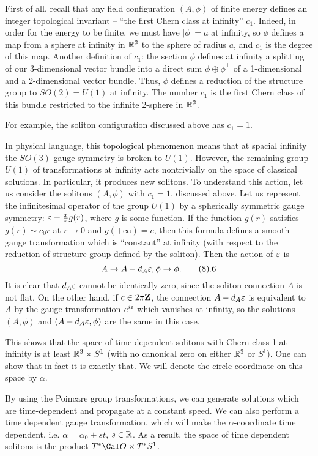 First of all, recall that
any field configuration $(A,\phi)$ of finite energy 
defines an integer 
topological invariant -- ``the first Chern class at infinity''
$c_1$. Indeed, in order for the energy to be finite, we must have 
$|\phi|=a$ at infinity, so $\phi$ defines a map from a
sphere at infinity in $\Bbb R^3$ to the sphere of radius $a$, and $c_1$ is
the degree of this map. Another definition of $c_1$:  
the section $\phi$ defines 
at infinity a splitting of our 3-dimensional vector bundle into a direct sum 
$\phi\oplus\phi^\perp$ of a 1-dimensional and a 2-dimensional vector bundle. 
Thus, $\phi$ defines a reduction of the structure group to $SO(2)=U(1)$ at 
infinity. The number $c_1$ is the first Chern class of this bundle restricted
to the infinite 2-sphere in $\Bbb R^3$. 

For example, the soliton configuration discussed above has $c_1=1$. 

In physical language, this topological phenomenon means that
at spacial infinity the $SO(3)$ gauge symmetry is broken to $U(1)$.  
However, the remaining group $U(1)$ of transformations at infinity acts
nontrivially on the space of classical solutions.
In particular, it produces new solitons. 
To understand this action, let us consider the solitons $(A,\phi)$ 
with $c_1=1$, discussed above.  
Let us represent the infinitesimal 
operator of the group $U(1)$ by a spherically symmetric gauge symmetry: 
$\varepsilon=\frac{x}{r}g(r)$, where $g$ is some function. 
If the function $g(r)$ satisfies $g(r)\sim c_0r$ at $r\to 0$ and 
$g(+\infty)=c$, then this formula defines a smooth gauge transformation 
which is ``constant'' at infinity (with respect to the reduction 
of structure group defined by the soliton). 
Then the action of $\varepsilon$ is
$$
A\to A-d_A\e, \phi\to \phi.\tag 8.6
$$
It is clear that $d_A\varepsilon$ cannot be identically zero, since 
the soliton connection $A$ is not flat. 
On the other hand, if $c\in 2\pi \bold Z$, the connection 
$A-d_A\varepsilon$ is equivalent to $A$ by the gauge transformation 
$e^{i\varepsilon}$ which vanishes at infinity, so the solutions 
$(A,\phi)$ and $(A-d_A\varepsilon,\phi)$ are the same in this case. 

This shows that the space of 
time-dependent solitons with Chern class 1 at infinity 
is at least $\Bbb R^3\times S^1$
(with no canonical zero on either $\Bbb R^3$ or $S^1$). 
One can show that in fact it is exactly 
that. We will denote the circle coordinate on this space by $\alpha$.

By using the Poincare group transformations, we can 
generate solutions which are time-dependent and propagate 
at a constant speed. We can also perform a 
time dependent gauge transformation, which will make  
the $\alpha$-coordinate time dependent, i.e. $\alpha=\alpha_0+st$, $s\in \Bbb R$. 
As a result, the space of 
time dependent solitons is the product $T^*\O\times T^*S^1$.

